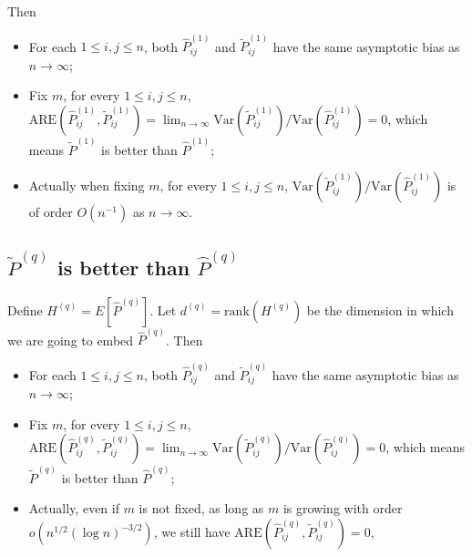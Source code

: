 \documentclass[a4paper]{article}
\begin{document}
Then
\begin{itemize}
	\item For each $1 \le i, j \le n$, both $\hat{P}_{ij}^{(1)}$ and $\widetilde{P}_{ij}^{(1)}$ have the same asymptotic bias as $n \to \infty$;
    \item Fix $m$, for every $1 \le i,j \le n$, $\mathrm{ARE}(\hat{P}_{ij}^{(1)}, \widetilde{P}_{ij}^{(1)}) = \lim_{n \to \infty} \mathrm{Var}(\widetilde{P}_{ij}^{(1)})/\mathrm{Var}(\hat{P}_{ij}^{(1)}) = 0$, which means $\widetilde{P}^{(1)}$ is better than $\hat{P}^{(1)}$;
    \item Actually when fixing $m$, for every $1 \le i,j \le n$, $\mathrm{Var}(\widetilde{P}_{ij}^{(1)})/\mathrm{Var}(\hat{P}_{ij}^{(1)})$ is of order $O(n^{-1})$ as $n \to \infty$.
\end{itemize}






\subsection{$\widetilde{P}^{(q)}$ is better than $\hat{P}^{(q)}$}
Define $H^{(q)} = E[\hat{P}^{(q)}]$.
Let $d^{(q)} = \mathrm{rank}(H^{(q)})$ be the dimension in which we are going to embed $\hat{P}^{(q)}$.
Then
\begin{itemize}
	\item For each $1 \le i, j \le n$, both $\hat{P}_{ij}^{(q)}$ and $\widetilde{P}_{ij}^{(q)}$ have the same asymptotic bias as $n \to \infty$;
    \item Fix $m$, for every $1 \le i,j \le n$, $\mathrm{ARE}(\hat{P}_{ij}^{(q)}, \widetilde{P}_{ij}^{(q)}) = \lim_{n \to \infty} \mathrm{Var}(\widetilde{P}_{ij}^{(q)})/\mathrm{Var}(\hat{P}_{ij}^{(q)}) = 0$, which means $\widetilde{P}^{(q)}$ is better than $\hat{P}^{(q)}$;
    \item Actually, even if $m$ is not fixed, as long as $m$ is growing with order $o(n^{1/2}(\log n)^{-3/2})$, we still have $\mathrm{ARE}(\hat{P}_{ij}^{(q)}, \widetilde{P}_{ij}^{(q)}) = 0$, 
\end{itemize}
\end{document}
